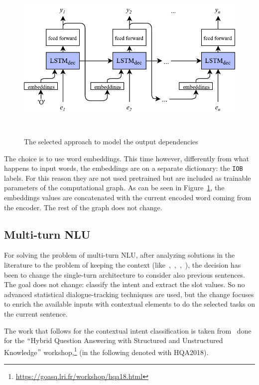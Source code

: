 \begin{figure}[!htb]
    \centering
    \includegraphics[max width=0.9\linewidth,max height=8cm,keepaspectratio]{figures/outputDependencies}
    \caption{The selected approach to model the output dependencies}\label{fig:outputDependencies}
\end{figure}

The choice is to use word embeddings. This time however, differently from what happens to input words, the embeddings are on a separate dictionary: the \texttt{IOB} labels. For this reason they are not used pretrained but are included as trainable parameters of the computational graph. As can be seen in Figure~\ref{fig:outputDependencies}, the embeddings values are concatenated with the current encoded word coming from the encoder. The rest of the graph does not change.

\subsection{Multi-turn NLU}
\label{approachMultiTurn}

For solving the problem of multi-turn NLU, after analyzing solutions in the literature to the problem of keeping the context (like~\cite{xu2014contextual},~\cite{bhargava2013easy},~\cite{shi2015contextual},~\cite{serban2016building}), the decision has been to change the single-turn architecture to consider also previous sentences. The goal does not change: classify the intent and extract the slot values. So no advanced statistical dialogue-tracking techniques are used, but the change focuses to enrich the available inputs with contextual elements to do the selected tasks on the current sentence.

The work that follows for the contextual intent classification is taken from~\cite{mensio2018multi} done for the $``$Hybrid Question Answering with Structured and Unstructured Knowledge$"$  workshop,\footnote{\url{https://goasq.lri.fr/workshop/hqa18.html}} (in the following denoted with HQA2018).

